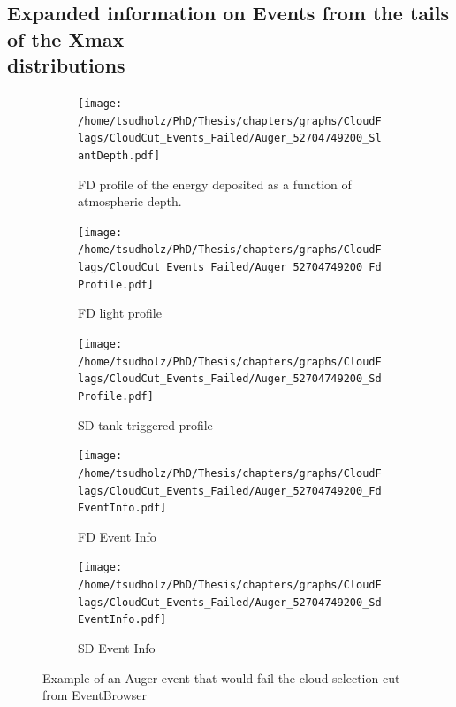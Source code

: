 \subsection{Expanded information on Events from the tails of the Xmax \\ distributions}


\begin{figure}[!p]
\centering
 \vspace{2cm}
  \begin{subfigure}[b]{\textwidth}
  \centering
  \texttt{[image: /home/tsudholz/PhD/Thesis/chapters/graphs/CloudFlags/CloudCut\_Events\_Failed/Auger\_52704749200\_SlantDepth.pdf]}
  \caption{FD profile of the energy deposited as a function of atmospheric depth.}
  \end{subfigure}
 \vspace{0.5cm}
  \begin{subfigure}[b]{0.45\textwidth}
  	\centering
  	\texttt{[image: /home/tsudholz/PhD/Thesis/chapters/graphs/CloudFlags/CloudCut\_Events\_Failed/Auger\_52704749200\_FdProfile.pdf]}
  	\caption{FD light profile}
  \end{subfigure}
  \begin{subfigure}[b]{0.45\textwidth}
  	\centering
  	\texttt{[image: /home/tsudholz/PhD/Thesis/chapters/graphs/CloudFlags/CloudCut\_Events\_Failed/Auger\_52704749200\_SdProfile.pdf]}
  	\caption{SD tank triggered profile}
  \end{subfigure}

  \begin{subfigure}[b]{0.45\textwidth}
  	\centering
	\texttt{[image: /home/tsudholz/PhD/Thesis/chapters/graphs/CloudFlags/CloudCut\_Events\_Failed/Auger\_52704749200\_FdEventInfo.pdf]}
  	\caption{FD Event Info}
  \end{subfigure}
  \begin{subfigure}[b]{0.45\textwidth}
  	\centering
	\texttt{[image: /home/tsudholz/PhD/Thesis/chapters/graphs/CloudFlags/CloudCut\_Events\_Failed/Auger\_52704749200\_SdEventInfo.pdf]}
  	\caption{SD Event Info}
  \end{subfigure}
  \caption{Example of an Auger event that would fail the cloud selection cut from EventBrowser}
\end{figure}


